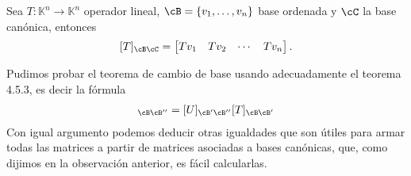 \documentclass[handout]{beamer} %
\newcommand{\Id}{\operatorname{Id}}
\newcommand{\R}{\mathbb R}
\newcommand{\K}{\mathbb K}
\begin{document}
\begin{frame}

\begin{observacion} Sea $T: \K^n \to \K^n$ operador lineal, $\cB = \{v_1,\ldots,v_n\}$ base ordenada y $\cC$ la base canónica,  entonces 
$$
[T]_{\cB\cC} = \begin{bmatrix}
    Tv_1 & Tv_2 & \cdots &Tv_n
\end{bmatrix}.
$$
\end{observacion}\pause
    

\begin{observacion}
Pudimos probar el teorema de cambio de base usando adecuadamente el teorema 4.5.3, es decir la fórmula
\begin{align*}
    [UT]_{\cB\cB''}=[U]_{\cB'\cB''}[T]_{\cB\cB'}
\end{align*}\pause
Con igual argumento podemos deducir otras igualdades que son útiles para armar todas las matrices a partir de matrices asociadas a bases canónicas, que, como  dijimos en la observación anterior, es fácil calcularlas. 
\end{observacion}
\end{frame}


\begin{frame}

\end{frame}
\end{document}
